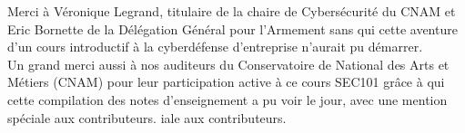 

\newpage

\thispagestyle{empty}

\begin{center}


\large{Merci à Véronique Legrand, titulaire de la chaire de Cybersécurité du CNAM et Eric Bornette de la Délégation Général pour l'Armement sans qui cette aventure d'un cours introductif à la cyberdéfense d'entreprise n'aurait pu démarrer. 
\\ 
Un grand merci aussi à nos auditeurs du Conservatoire de National des Arts et Métiers (CNAM) pour leur participation active à ce cours SEC101 grâce à qui cette compilation des notes d'enseignement a  pu voir le jour, avec une mention spéciale aux contributeurs. 
iale aux contributeurs. 
}

\end{center}




\clearpage 


